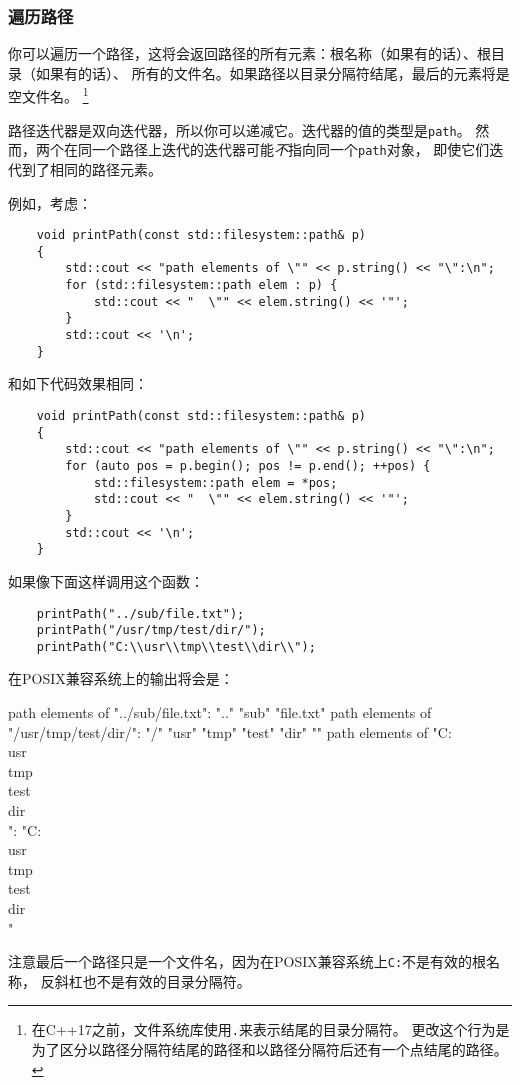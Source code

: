\subsubsection{遍历路径}
你可以遍历一个路径，这将会返回路径的所有元素：根名称（如果有的话）、根目录（如果有的话）、
所有的文件名。如果路径以目录分隔符结尾，最后的元素将是空文件名。
\footnote{在C++17之前，文件系统库使用\texttt{.}来表示结尾的目录分隔符。
更改这个行为是为了区分以路径分隔符结尾的路径和以路径分隔符后还有一个点结尾的路径。}

路径迭代器是双向迭代器，所以你可以递减它。迭代器的值的类型是\texttt{path}。
然而，两个在同一个路径上迭代的迭代器可能\emph{不}指向同一个\texttt{path}对象，
即使它们迭代到了相同的路径元素。

例如，考虑：
\begin{lstlisting}
    void printPath(const std::filesystem::path& p)
    {
        std::cout << "path elements of \"" << p.string() << "\":\n";
        for (std::filesystem::path elem : p) {
            std::cout << "  \"" << elem.string() << '"';
        }
        std::cout << '\n';
    }
\end{lstlisting}
和如下代码效果相同：
\begin{lstlisting}
    void printPath(const std::filesystem::path& p)
    {
        std::cout << "path elements of \"" << p.string() << "\":\n";
        for (auto pos = p.begin(); pos != p.end(); ++pos) {
            std::filesystem::path elem = *pos;
            std::cout << "  \"" << elem.string() << '"';
        }
        std::cout << '\n';
    }
\end{lstlisting}
如果像下面这样调用这个函数：
\begin{lstlisting}
    printPath("../sub/file.txt");
    printPath("/usr/tmp/test/dir/");
    printPath("C:\\usr\\tmp\\test\\dir\\");
\end{lstlisting}
在POSIX兼容系统上的输出将会是：
\begin{blacklisting}
    path elements of "../sub/file.txt":
    ".."  "sub"  "file.txt"
    path elements of "/usr/tmp/test/dir/":
    "/"  "usr"  "tmp"  "test"  "dir"  ""
    path elements of "C:\\usr\\tmp\\test\\dir\\":
    "C:\\usr\\tmp\\test\\dir\\"
\end{blacklisting}
注意最后一个路径只是一个文件名，因为在POSIX兼容系统上\texttt{C:}不是有效的根名称，
反斜杠也不是有效的目录分隔符。

